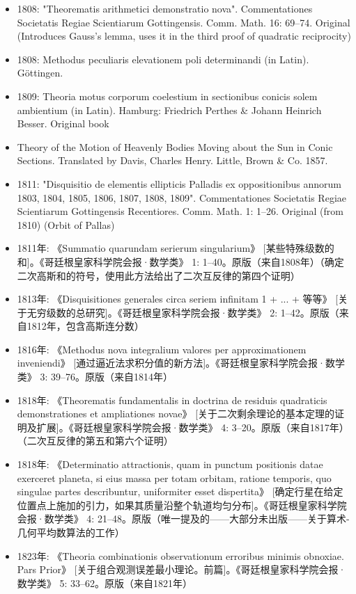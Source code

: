 \begin{itemize}
\item 1808: "Theorematis arithmetici demonstratio nova". Commentationes Societatis Regiae Scientiarum Gottingensis. Comm. Math. 16: 69–74. Original (Introduces Gauss's lemma, uses it in the third proof of quadratic reciprocity)
\item 1808: Methodus peculiaris elevationem poli determinandi (in Latin). Göttingen.
\item 1809: Theoria motus corporum coelestium in sectionibus conicis solem ambientium (in Latin). Hamburg: Friedrich Perthes & Johann Heinrich Besser. Original book
\item Theory of the Motion of Heavenly Bodies Moving about the Sun in Conic Sections. Translated by Davis, Charles Henry. Little, Brown & Co. 1857.
\item 1811: "Disquisitio de elementis ellipticis Palladis ex oppositionibus annorum 1803, 1804, 1805, 1806, 1807, 1808, 1809". Commentationes Societatis Regiae Scientiarum Gottingensis Recentiores. Comm. Math. 1: 1–26. Original (from 1810) (Orbit of Pallas)
\item 1811年: 《Summatio quarundam serierum singularium》 [某些特殊级数的和]。《哥廷根皇家科学院会报·数学类》 1: 1–40。原版（来自1808年）（确定二次高斯和的符号，使用此方法给出了二次互反律的第四个证明）
\item 1813年: 《Disquisitiones generales circa seriem infinitam 1 + ... + 等等》 [关于无穷级数的总研究]。《哥廷根皇家科学院会报·数学类》 2: 1–42。原版（来自1812年，包含高斯连分数）
\item 1816年: 《Methodus nova integralium valores per approximationem inveniendi》 [通过逼近法求积分值的新方法]。《哥廷根皇家科学院会报·数学类》 3: 39–76。原版（来自1814年）
\item 1818年: 《Theorematis fundamentalis in doctrina de residuis quadraticis demonstrationes et ampliationes novae》 [关于二次剩余理论的基本定理的证明及扩展]。《哥廷根皇家科学院会报·数学类》 4: 3–20。原版（来自1817年）（二次互反律的第五和第六个证明）
\item 1818年: 《Determinatio attractionis, quam in punctum positionis datae exerceret planeta, si eius massa per totam orbitam, ratione temporis, quo singulae partes describuntur, uniformiter esset dispertita》 [确定行星在给定位置点上施加的引力，如果其质量沿整个轨道均匀分布]。《哥廷根皇家科学院会报·数学类》 4: 21–48。原版（唯一提及的——大部分未出版——关于算术-几何平均数算法的工作）
\item 1823年: 《Theoria combinationis observationum erroribus minimis obnoxiae. Pars Prior》 [关于组合观测误差最小理论。前篇]。《哥廷根皇家科学院会报·数学类》 5: 33–62。原版（来自1821年）

\end{itemize}
